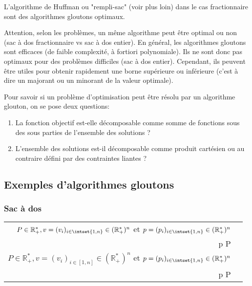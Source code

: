\documentclass{scrartcl}
\begin{document}
			\exemple L'algorithme de Huffman ou "rempli-sac" (voir plus loin) dans le cas fractionnaire sont des algorithmes gloutons optimaux.

			\rem Attention, selon les problèmes, un même algorithme peut être optimal ou non (sac à dos fractionnaire vs sac à dos entier). 
			En général, les algorithmes gloutons sont efficaces (de faible complexité, à fortiori polynomiale). 
			Ils ne sont donc pas optimaux pour des problèmes difficiles (sac à dos entier). 
			Cependant, ils peuvent être utiles pour obtenir rapidement une borne supérieure ou inférieure (c'est à dire un majorant ou un minorant de la valeur optimale).

			\rem Pour savoir si un problème d'optimisation peut être résolu par un algorithme glouton, on se pose deux questions:
			\begin{enumerate}
				\item La fonction objectif est-elle décomposable comme somme de fonctions sous des sous parties de l'ensemble des solutions ?
				\item L'ensemble des solutions est-il décomposable comme produit cartésien ou au contraire défini par des contraintes liantes ?
			\end{enumerate}

		\subsection{Exemples d'algorithmes gloutons}
			\subsubsection{Sac à dos}
					\begin{center}\begin{tabular}{r l}
						\pbinlist{Sac à dos}
							{\( P \in \mathbb{R}^*_+, v=(v_i)_{i \in \intset{1,n}} \in (\mathbb{R}^*_+)^n\) et \(p = (p_i)_{i \in \intset{1,n}} \in (\mathbb{R}^*_+)^n\)}
							{\(\max\limits_{\substack{\delta \in \set{0,1}^n \\ \delta\cdot p \leq P}} \underbrace{\delta.v}_{=f(v)}\)} \\[20pt]
						\pbinlist{Sac à dos fractionnaire}
							{\( P \in \mathbb{R}^*_+, v=(v_i)_{i \in [1,n]} \in (\mathbb{R}^*_+)^n\) et \(p = (p_i)_{i \in \intset{1,n}} \in (\mathbb{R}^*_+)^n\)}
							{\(\max\limits_{\substack{\delta \in [0,1]^n \\ \delta\cdot p \leq P}} \underbrace{\delta.v}_{=f(v)}\)}
					\end{tabular}\end{center}	
\end{document}

